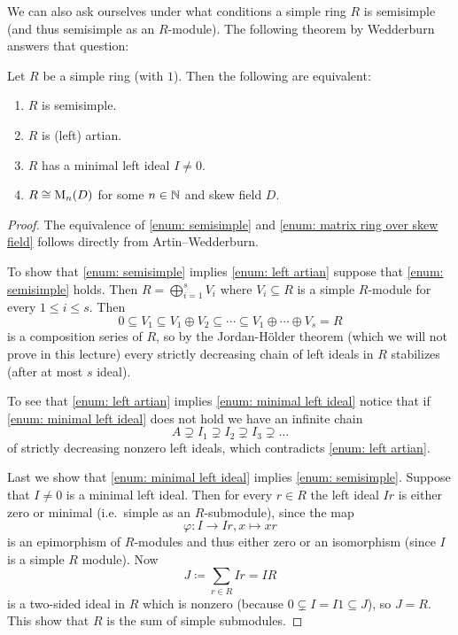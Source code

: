 We can also ask ourselves under what conditions a simple ring $R$ is semisimple (and thus semisimple as an $R$-module). The following theorem by Wedderburn answers that question:


\begin{thrm}[Wedderburn]
  Let $R$ be a simple ring (with $1$). Then the following are equivalent:
  \begin{enumerate}[label=\emph{\roman*)},leftmargin=*]
    \item \label{enum: semisimple}
      $R$ is semisimple.
    \item \label{enum: left artian}
      $R$ is (left) artian.
    \item \label{enum: minimal left ideal}
      $R$ has a minimal left ideal $I \neq 0$.
    \item \label{enum: matrix ring over skew field}
      $R \cong \operatorname{M}_n(D)$ for some $n \in \mathbb{N}$ and skew field $D$.
  \end{enumerate}
\end{thrm}
\begin{proof}
  The equivalence of \ref{enum: semisimple} and \ref{enum: matrix ring over skew field} follows directly from Artin--Wedderburn.
  
  To show that \ref{enum: semisimple} implies \ref{enum: left artian} suppose that \ref{enum: semisimple} holds. Then $R = \bigoplus_{i=1}^s V_i$ where $V_i \subseteq R$ is a simple $R$-module for every $1 \leq i \leq s$. Then
  \[
    0 \subseteq V_1 \subseteq V_1 \oplus V_2 \subseteq \dotsb \subseteq V_1 \oplus \dotsb \oplus V_s = R
  \]
  is a composition series of $R$, so by the Jordan-Hölder theorem (which we will not prove in this lecture) every strictly decreasing chain of left ideals in $R$ stabilizes (after at most $s$ ideal).
  
  To see that \ref{enum: left artian} implies \ref{enum: minimal left ideal} notice that if \ref{enum: minimal left ideal} does not hold we have an infinite chain
  \[
    A \supsetneq I_1 \supsetneq I_2 \supsetneq I_3 \supsetneq \dotso
  \]
  of strictly decreasing nonzero left ideals, which contradicts \ref{enum: left artian}.
  
  Last we show that \ref{enum: minimal left ideal} implies \ref{enum: semisimple}. Suppose that $I \neq 0$ is a minimal left ideal. Then for every $r \in R$ the left ideal $Ir$ is either zero or minimal (i.e.\ simple as an $R$-submodule), since the map
  \[
    \varphi \colon I \to Ir, x \mapsto xr
  \]
  is an epimorphism of $R$-modules and thus either zero or an isomorphism (since $I$ is a simple $R$ module). Now
  \[
    J \coloneqq \sum_{r \in R} Ir = IR
  \]
  is a two-sided ideal in $R$ which is nonzero (because $0 \subsetneq I = I1 \subseteq J$), so $J = R$. This show that $R$ is the sum of simple submodules.
\end{proof}


